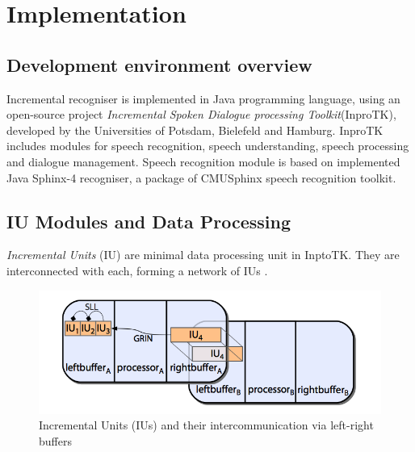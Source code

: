 \chapter{Implementation}
\label{chap:implem}
\section {Development environment overview}
Incremental recogniser is implemented in Java programming language, using
an open-source project \textit {Incremental Spoken Dialogue processing
Toolkit}(InproTK), developed by the Universities of Potsdam, Bielefeld and
Hamburg. InproTK includes modules for speech recognition, speech understanding,
speech processing and dialogue management.
Speech recognition module is based on implemented Java Sphinx-4 recogniser, a
package of CMUSphinx speech recognition toolkit. 
\section {IU Modules and Data Processing}
\textit {Incremental Units} (IU) are minimal data processing unit in InptoTK.
They are interconnected with each, forming a network of IUs \parencite
{baumann2013:phd}.

\begin{figure}[htbp]
  \centering
    \includegraphics[width=1.0\textwidth]{images/iuandbuffer.png}
 \caption{ Incremental Units (IUs) and their intercommunication via left-right
 buffers \parencite {baumann2013:phd}}
  \label{fig:Bild1}
\end {figure}
